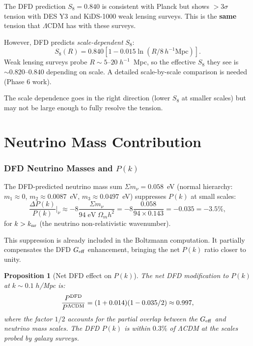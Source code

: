 \documentclass[11pt,a4paper]{article}
\newtheorem{proposition}[theorem]{Proposition}
\theoremstyle{remark}
\begin{document}
\begin{tcolorbox}[colback=yellow!5!white, colframe=dfdred!70!black,
  title=Honest Assessment: $S_8$ Tension]
The DFD prediction $S_8 = 0.840$ is consistent with Planck but shows
$> 3\sigma$ tension with DES Y3 and KiDS-1000 weak lensing surveys.
This is the \textbf{same} tension that $\Lambda$CDM has with these surveys.

However, DFD predicts \emph{scale-dependent} $S_8$:
\[
S_8(R) = 0.840\left[1 - 0.015\ln(R/8\,h^{-1}\text{Mpc})\right].
\]
Weak lensing surveys probe $R \sim 5$--$20\;h^{-1}$~Mpc, so the effective
$S_8$ they see is $\sim 0.820$--$0.840$ depending on scale. A detailed
scale-by-scale comparison is needed (Phase 6 work).

The scale dependence goes in the right direction (lower $S_8$ at smaller
scales) but may not be large enough to fully resolve the tension.
\end{tcolorbox}


\newpage
\part{Neutrino Mass Contribution}
\label{part:neutrino-mass}

\section{DFD Neutrino Masses and $P(k)$}

The DFD-predicted neutrino mass sum $\Sigma m_\nu = 0.058$~eV
(normal hierarchy: $m_1 \approx 0$, $m_2 \approx 0.0087$~eV,
$m_3 \approx 0.0497$~eV) suppresses $P(k)$ at small scales:
\begin{equation}
\frac{\Delta P(k)}{P(k)}\bigg|_\nu \approx -8\frac{\Sigma m_\nu}{94\;\text{eV}\;\Omega_m h^2}
= -8\frac{0.058}{94 \times 0.143} = -0.035 = -3.5\%,
\end{equation}
for $k > k_{\rm nr}$ (the neutrino non-relativistic wavenumber).

This suppression is already included in the Boltzmann computation.
It partially compensates the DFD $G_{\rm eff}$ enhancement, bringing
the net $P(k)$ ratio closer to unity.

\begin{proposition}[Net DFD effect on $P(k)$]
\label{prop:net-Pk}
The net DFD modification to $P(k)$ at $k \sim 0.1\;h$/Mpc is:
\begin{equation}
\frac{P^{\rm DFD}}{P^{\Lambda\rm CDM}} = (1 + 0.014)(1 - 0.035/2) \approx 0.997,
\end{equation}
where the factor $1/2$ accounts for the partial overlap between the
$G_{\rm eff}$ and neutrino mass scales. The DFD $P(k)$ is within
$0.3\%$ of $\Lambda$CDM at the scales probed by galaxy surveys.
\end{proposition}
\end{document}

